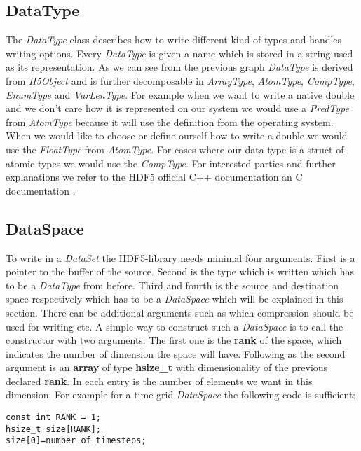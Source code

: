 \documentclass{article}
\begin{document}
\subsection{DataType}
The \textit{DataType} class describes how to write different kind of types and handles writing options. Every \textit{DataType} is given a name which is stored in a string used as its representation. As we can see from the previous graph \textit{DataType} is derived from \textit{H5Object} and is further decomposable in \textit{ArrayType}, \textit{AtomType}, \textit{CompType}, \textit{EnumType} and \textit{VarLenType}. For example when we want to write a native double and we don't care how it is represented on our system we would use a \textit{PredType} from \textit{AtomType} because it will use the definition from the operating system. When we would like to choose or define ourself how to write a double we would use the \textit{FloatType} from \textit{AtomType}. For cases where our data type is a struct of atomic types we would use the \textit{CompType}. For interested parties and further explanations we refer to the HDF5 official C++ documentation\cite{hdf5cppdoc} an C documentation \cite{hdf5cdoc}.
\subsection{DataSpace}
To write in a \textit{DataSet} the HDF5-library needs minimal four arguments. First is a pointer to the buffer of the source. Second is the type which is written which has to be a \textit{DataType} from before. Third and fourth is the source and destination space respectively which has to be a \textit{DataSpace} which will be explained in this section. There can be additional arguments such as which compression should be used for writing etc. A simple way to construct such a \textit{DataSpace} is to call the constructor with two arguments. The first one is the \textbf{rank} of the space, which indicates the number of dimension the space will have. Following as the second argument is an \textbf{array} of type \textbf{hsize\_t} with dimensionality of the previous declared \textbf{rank}. In each entry is the number of elements we want in this dimension. For example for a time grid \textit{DataSpace} the following code is sufficient:\\

\begin{lstlisting}
const int RANK = 1;
hsize_t size[RANK];
size[0]=number_of_timesteps;
\end{lstlisting}
\end{document}
